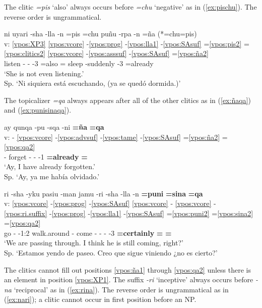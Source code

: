 \documentclass[output=paper]{langscibook}
\begin{document}
The clitic \textit{=pis} `also' always occurs before \textit{=chu} `negative' as in (\ref{ex:pischu}). The reverse order is ungrammatical.

\ea \label{ex:pischu}{
    \glll {} ni uyari -sha -lla -n =pis =chu puñu -rpa -n =ña
    (*=chu=pis) \\
    v: \ref{vpos:XP3} \ref{vpos:vcore} -\ref{vpos:prog} -\ref{vpos:lla1} -\ref{vpos:SAsuf} =\ref{vpos:pis2} =\ref{vpos:clitics2} \ref{vpos:vcore} -\ref{vpos:asssuf} -\ref{vpos:SAsuf} =\ref{vpos:ña2} \\
   {} \Neg{} listen -\Prog{} -\Limit{} -3\Sg{} =also =\Neg{} sleep -suddenly -3\Sg{} =already  \\
    \glt `She is not even listening.' \\ Sp. `Ni siquiera está escuchando, (ya se quedó dormida.)' }
\z 

The topicalizer \textit{=qa} always appears after all of the other clitics as in (\ref{ex:ñaqa}) and (\ref{ex:punisinaqa}).

\ea \label{ex:ñaqa}{
    \glll {} ay qunqa -pu -sqa -ni \textbf{=ña} \textbf{=qa} \\
    v: - \ref{vpos:vcore} -\ref{vpos:advsuf} -\ref{vpos:tame} -\ref{vpos:SAsuf} =\ref{vpos:ña2} =\ref{vpos:qa2} \\
    {} - forget -\Cmpl{} -\Pst{} -1\Sg{} \textbf{=already} \textbf{=\Top{}} \\
    \glt `Ay, I have already forgotten.' \\ Sp. `Ay, ya me había olvidado.' } 
\z 

\ea \label{ex:punisinaqa}{
    \glll {} ri -sha -yku pasiu -man jamu -ri -sha -lla -n \textbf{=puni} \textbf{=sina} \textbf{=qa}  \\
    v: \ref{vpos:vcore} -\ref{vpos:prog} -\ref{vpos:SAsuf} \ref{vpos:vcore} - \ref{vpos:vcore} -\ref{vpos:ri.suffix} -\ref{vpos:prog} -\ref{vpos:lla1} -\ref{vpos:SAsuf} =\ref{vpos:puni2} =\ref{vpos:sina2} =\ref{vpos:qa2}  \\
    {} go -\Prog{} -1:2\Pl{} walk.around -\All{} come -\Aff{} -\Prog{} -\Limit{} -3\Sg{} \textbf{=certainly} \textbf{=\Dub{}} \textbf{=\Top{}}   \\
    \glt  `We are passing through. I think he is still coming, right?' \\ Sp. `Estamos yendo de paseo. Creo que sigue viniendo ¿no es cierto?' }  \\
\z 

The clitics cannot fill out positions \ref{vpos:ña1} through  \ref{vpos:qa2} unless there is an element in position \ref{vpos:XP1}. The suffix \textit{-ri} `inceptive' always occurs before \textit{-na} `reciprocal' as in (\ref{ex:rina}). The reverse order is ungrammatical as in (\ref{ex:nari}); a clitic cannot occur in first position before an NP.
\end{document}
